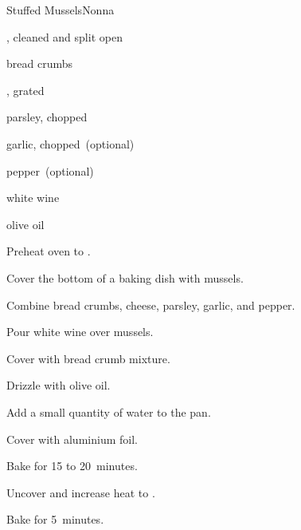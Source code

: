 \begin{recipe}{Stuffed Mussels}{Nonna}{}

\begin{ingredients}
\item {}, cleaned and split open
\item bread crumbs
\item {}, grated
\item parsley, chopped
\item garlic, chopped~(optional)
\item pepper~(optional)
\item white wine
\item olive oil
\end{ingredients}

\begin{directions}
\item Preheat oven to .
\item Cover the bottom of a baking dish with mussels.
\item Combine bread crumbs, cheese, parsley, garlic, and pepper.
\item Pour white wine over mussels.
\item Cover with bread crumb mixture.
\item Drizzle with olive oil.
\item Add a small quantity of water to the pan.
\item Cover with aluminium foil.
\item Bake for 15 to 20~minutes.
\item Uncover and increase heat to .
\item Bake for 5~minutes.
\end{directions}

\end{recipe}
